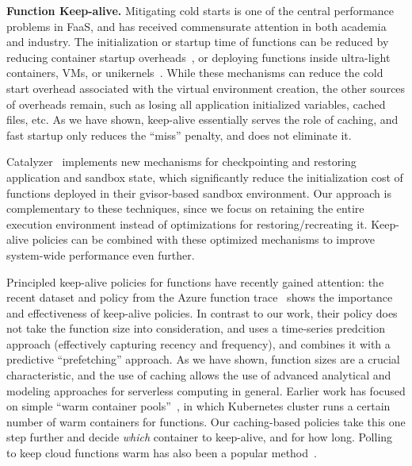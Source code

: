\label{sec:related}
\vspace*{\subsecspace}


\noindent \textbf{Function Keep-alive.}
Mitigating cold starts is one of the central performance problems in FaaS, and has received commensurate attention in both academia and industry.
%
The initialization or startup time of functions can be reduced  by reducing container startup overheads~\cite{oakes_sock_2018,mohan_agile_2019, akkus_sand_2018}, or deploying functions inside ultra-light containers, VMs, or unikernels~\cite{unikernels,firecracker-nsdi20}.
%
While these mechanisms can reduce the cold start overhead associated with the virtual environment creation, the other sources of overheads remain, such as losing all application initialized variables, cached files, etc.
As we have shown, keep-alive essentially serves the role of caching, and fast startup only reduces the ``miss'' penalty, and does not eliminate it.

Catalyzer~\cite{du2020catalyzer} implements new mechanisms for checkpointing and restoring application and sandbox state, which significantly reduce the initialization cost of functions deployed in their gvisor-based sandbox environment. 
Our approach is complementary to these techniques, since we focus on retaining the entire execution environment instead of optimizations for restoring/recreating it. 
Keep-alive policies can be combined with these optimized mechanisms to improve system-wide performance even further. 


Principled keep-alive policies for functions have recently gained attention: the recent dataset and policy from the Azure function trace~\cite{shahrad_serverless_2020} shows the importance and effectiveness of keep-alive policies. 
In contrast to our work, their policy does not take the function size into consideration, and uses a time-series predcition approach (effectively capturing recency and frequency), and combines it with a predictive ``prefetching'' approach. 
As we have shown, function sizes are a crucial characteristic, and the use of caching allows the use of advanced analytical and modeling approaches for serverless computing in general. 
Earlier work has focused on simple ``warm container pools''~\cite{lin_mitigating_2019}, in which Kubernetes cluster runs a certain number of warm containers for functions. 
Our caching-based policies take this one step further and decide \emph{which} container to keep-alive, and for how long. 
Polling to keep cloud functions warm has also been a popular method~\cite{warm2,warm1}.



